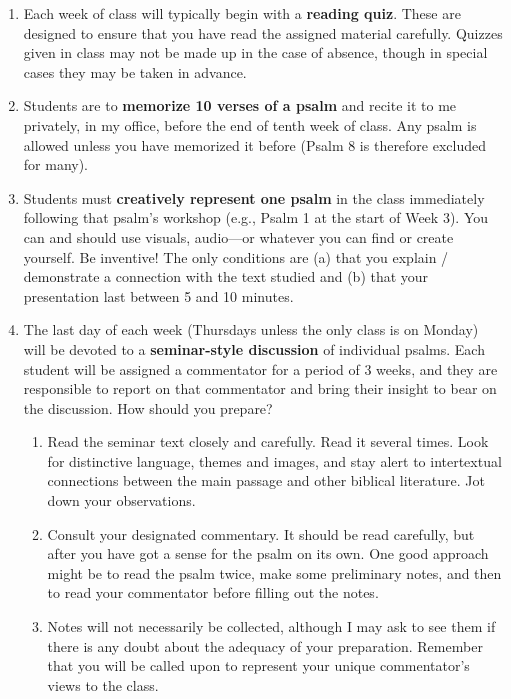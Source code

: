 \documentclass[titlepage]{article}
\begin{document}
\begin{enumerate}
 \item Each week of class will typically begin with a \textbf{reading
   quiz}. These are designed to ensure that you have read the assigned
   material carefully. Quizzes given in class may not be made up in the
   case of absence, though in special cases they may be taken in advance.
 \item Students are to \textbf{memorize 10 verses of a psalm} and recite
   it to me privately, in my office, before the end of tenth week of
   class. Any psalm is allowed unless you have memorized it before
   (Psalm 8 is therefore excluded for many).
 \item Students must \textbf{creatively represent one psalm} in the class
   immediately following that psalm’s workshop (e.g., Psalm 1 at the
   start of Week 3). You can and should use visuals, audio---or whatever
   you can find or create yourself. Be inventive! The only conditions
   are (a) that you explain / demonstrate a connection with the text
   studied and (b) that your presentation last between 5 and 10 minutes.
 \item The last day of each week (Thursdays unless the only class is on
   Monday) will be devoted to a \textbf{seminar-style discussion} of
   individual psalms. Each student will be assigned a commentator for a
   period of 3 weeks, and they are responsible to report on that
   commentator and bring their insight to bear on the discussion. How
   should you prepare?
	\begin{enumerate}
	 \item Read the seminar text closely and carefully. Read it several
       times. Look for distinctive language, themes and images, and stay
       alert to intertextual connections between the main passage and
       other biblical literature. Jot down your observations.
	 \item Consult your designated commentary. It should be read
       carefully, but after you have got a sense for the psalm on its
       own. One good approach might be to read the psalm twice, make
       some preliminary notes, and then to read your commentator before
       filling out the notes.
	 \item Notes will not necessarily be collected, although I may ask to
       see them if there is any doubt about the adequacy of your
       preparation. Remember that you will be called upon to represent
       your unique commentator’s views to the class.
	\end{enumerate}

\end{enumerate}
\end{document}
